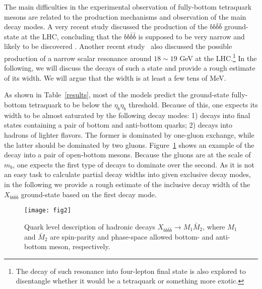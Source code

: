 \documentclass[twocolumn,showpacs,superscriptaddress,preprintnumbers,nofootinbib,prd]{revtex4-1}
\begin{document}
The main difficulties in the experimental observation of fully-bottom
tetraquark mesons are related to the production mechanisms and observation
of the main decay modes. A very recent study discussed the
production of the $bb\bar b\bar b$ ground-state at the LHC,
concluding that the $bb\bar b\bar b$ is supposed to be very narrow and
likely to be discovered \cite{Eichten:2017ual}.
Another recent study~\cite{Vega-Morales:2017pmm} also discussed
the possible production of a narrow scalar resonance around $18\sim19$ GeV
at the LHC.\footnote{The decay of such resonance into four-lepton final state is
also explored to disentangle whether it would be a tetraquark or something more exotic.}
In the following, we will discuss the decays of such a state  and provide a rough
estimate of its width. We will argue that the width is at least a few tens of MeV.

As shown in Table~\ref{results}, most of the models predict the ground-state
fully-bottom tetraquark to be below the $\eta_b\eta_b$ threshold. Because of this,
one expects its width to be almost saturated by the following decay modes:
1) decays into final states containing a pair of bottom and anti-bottom quarks;
2) decays into hadrons of lighter flavors. The former is dominated by one-gluon exchange,
while the latter should be dominated by two gluons. Figure~\ref{dec} shows an
example of the decay into a pair of open-bottom mesons.
Because the gluons are at the scale of $m_b$, one expects the first type
of decays to dominate over the second. As it is not an easy task to calculate
partial decay widths into given exclusive decay modes, in the following we
provide a rough estimate of the inclusive decay width of the
$X_{bb\bar b\bar b}$ ground-state based on the first decay mode.

\begin{figure}[tb]
\texttt{[image: fig2]}
\caption{Quark level description of hadronic decays $X_{bb\bar{b}\bar{b}}  \to
M_1 \bar{M}_2$, where $M_1$ and $\bar{M}_2$ are spin-parity and phase-space
allowed bottom- and anti-bottom meson, respectively.}
\label{dec}
\end{figure}
\end{document}
